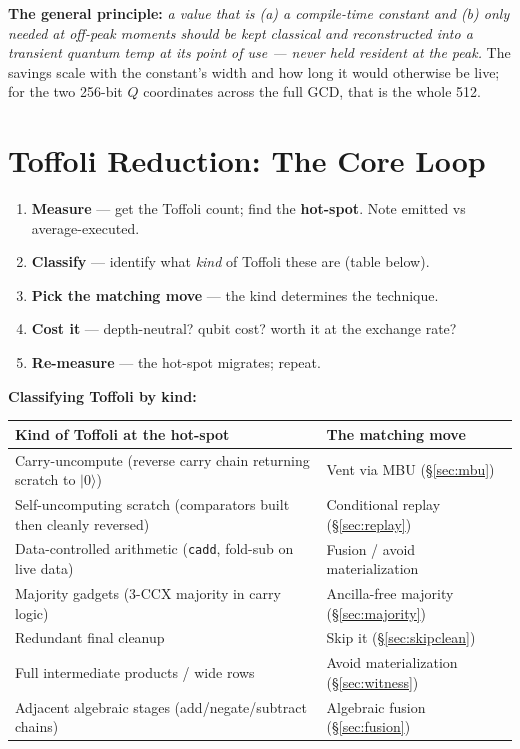 \documentclass[11pt,a4paper]{article}
\newcommand{\ket}[1]{$|#1\rangle$\xspace}
\newcommand{\tof}{Toffoli\xspace}
\begin{document}
\textbf{The general principle:} \emph{a value that is (a) a compile-time constant and (b) only needed
at off-peak moments should be kept classical and reconstructed into a transient quantum temp at its
point of use --- never held resident at the peak.} The savings scale with the constant's width and how
long it would otherwise be live; for the two 256-bit $Q$ coordinates across the full GCD, that is the
whole 512.

\section{Toffoli Reduction: The Core Loop}
\label{sec:tofloop}

\begin{enumerate}
  \item \textbf{Measure} --- get the \tof count; find the \textbf{hot-spot}. Note emitted vs average-executed.
  \item \textbf{Classify} --- identify what \emph{kind} of Toffoli these are (table below).
  \item \textbf{Pick the matching move} --- the kind determines the technique.
  \item \textbf{Cost it} --- depth-neutral? qubit cost? worth it at the exchange rate?
  \item \textbf{Re-measure} --- the hot-spot migrates; repeat.
\end{enumerate}

\textbf{Classifying Toffoli by kind:}
\begin{center}
\begin{tabular}{p{6.5cm}p{6cm}}
\toprule
\textbf{Kind of Toffoli at the hot-spot} & \textbf{The matching move} \\
\midrule
Carry-uncompute (reverse carry chain returning scratch to \ket{0}) & Vent via MBU (\S\ref{sec:mbu}) \\
Self-uncomputing scratch (comparators built then cleanly reversed) & Conditional replay (\S\ref{sec:replay}) \\
Data-controlled arithmetic (\texttt{cadd}, fold-sub on live data) & Fusion / avoid materialization \\
Majority gadgets (3-CCX majority in carry logic) & Ancilla-free majority (\S\ref{sec:majority}) \\
Redundant final cleanup & Skip it (\S\ref{sec:skipclean}) \\
Full intermediate products / wide rows & Avoid materialization (\S\ref{sec:witness}) \\
Adjacent algebraic stages (add/negate/subtract chains) & Algebraic fusion (\S\ref{sec:fusion}) \\
\bottomrule
\end{tabular}
\end{center}
\end{document}

